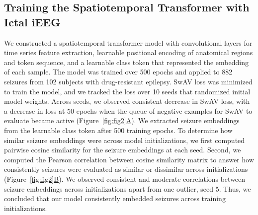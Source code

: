 \documentclass[11pt]{article}
\begin{document}
\subsection*{Training the Spatiotemporal Transformer with Ictal iEEG}
We constructed a spatiotemporal transformer model with convolutional layers for time series feature extraction, learnable positional encoding of anatomical regions and token sequence, and a learnable class token that represented the embedding of each sample. The model was trained over 500 epochs and applied to 882 seizures from 102 subjects with drug-resistant epilepsy. SwAV loss was minimized to train the model, and we tracked the loss over 10 seeds that randomized initial model weights. Across seeds, we observed consistent decrease in SwAV loss, with a decrease in loss at 50 epochs when the queue of negative examples for SwAV to evaluate became active (Figure~\hyperref[fig:fig2]{\ref*{fig:fig2}A}). We extracted seizure embeddings from the learnable class token after 500 training epochs. To determine how similar seizure embeddings were across model initializations, we first computed pairwise cosine similarity for the seizure embeddings at each seed. Second, we computed the Pearson correlation between cosine similarity matrix to answer how consistently seizures were evaluated as similar or dissimilar across initializations (Figure~\hyperref[fig:fig2]{\ref*{fig:fig2}B}). We observed consistent and moderate correlations between seizure embeddings across initializations apart from one outlier, seed 5. Thus, we concluded that our model consistently embedded seizures across training initializations.
\end{document}
